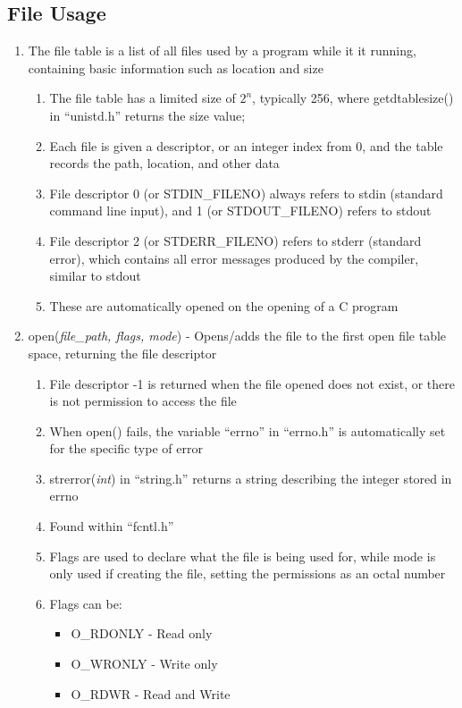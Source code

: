 \documentclass[11 pt, twoside]{article}
\begin{document}
\subsection{File Usage}
\begin{enumerate}
\item The file table is a list of all files used by a program while it it running, containing basic information such as location and size
\begin{enumerate}
\item The file table has a limited size of $2^n$, typically 256, where getdtablesize() in ``unistd.h'' returns the size value;
\item Each file is given a descriptor, or an integer index from 0, and the table records the path, location, and other data 
\item File descriptor 0 (or STDIN\_FILENO) always refers to stdin (standard command line input), and 1 (or STDOUT\_FILENO) refers to stdout
\item File descriptor 2 (or STDERR\_FILENO) refers to stderr (standard error), which contains all error messages produced by the compiler, similar to stdout
\item These are automatically opened on the opening of a C program
\end{enumerate}
\item open(\textit{file\_path, flags, mode}) - Opens/adds the file to the first open file table space, returning the file descriptor
\begin{enumerate}
\item File descriptor -1 is returned when the file opened does not exist, or there is not permission to access the file
\item When open() fails, the variable ``errno'' in ``errno.h'' is automatically set for the specific type of error
\item strerror(\textit{int}) in ``string.h'' returns a string describing the integer stored in errno
\item Found within ``fcntl.h''
\item Flags are used to declare what the file is being used for, while mode is only used if creating the file, setting the permissions as an octal number
\item Flags can be:
\begin{itemize}
\item O\_RDONLY - Read only
\item O\_WRONLY - Write only
\item O\_RDWR - Read and Write

\end{itemize}
\end{enumerate}
\end{enumerate}
\end{document}
